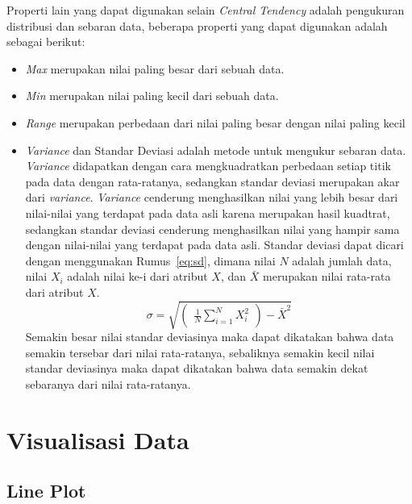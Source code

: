 Properti lain yang dapat digunakan selain \textit{Central Tendency} adalah pengukuran distribusi dan sebaran data, beberapa properti yang dapat digunakan adalah sebagai berikut:
\begin{itemize}
    \item \textit{Max} merupakan nilai paling besar dari sebuah data.
    \item \textit{Min} merupakan nilai paling kecil dari sebuah data.
    \item \textit{Range} merupakan perbedaan dari nilai paling besar dengan nilai paling kecil
    \item  \textit{Variance} dan Standar Deviasi adalah metode untuk mengukur sebaran data. \textit{Variance} didapatkan dengan cara mengkuadratkan perbedaan setiap titik pada data dengan rata-ratanya, sedangkan standar deviasi merupakan akar dari \textit{variance}. \textit{Variance} cenderung menghasilkan nilai yang lebih besar dari nilai-nilai yang terdapat pada data asli karena merupakan hasil kuadtrat, sedangkan standar deviasi cenderung menghasilkan nilai yang hampir sama dengan nilai-nilai yang terdapat pada data asli. Standar deviasi dapat dicari dengan menggunakan Rumus~\ref{eq:sd}, dimana nilai $N$ adalah jumlah data, nilai $X_i$ adalah nilai ke-i dari atribut $X$, dan $\bar{X}$ merupakan nilai rata-rata dari atribut $X$.
    \begin{equation}
    \label{eq:sd}
        \sigma = \sqrt{
        \begin{pmatrix}
            \frac{1}{N} \sum_{i=1}^NX_i^2
        \end{pmatrix}
        -\bar{X}^2}
    \end{equation}
    Semakin besar nilai standar deviasinya maka dapat dikatakan bahwa data semakin tersebar dari nilai rata-ratanya, sebaliknya semakin kecil nilai standar deviasinya maka dapat dikatakan bahwa data semakin dekat sebaranya dari nilai rata-ratanya.
\end{itemize}

\section{Visualisasi Data}
\label{sec:visdat}

\subsection{Line Plot}
\label{subsec:lineplo}

